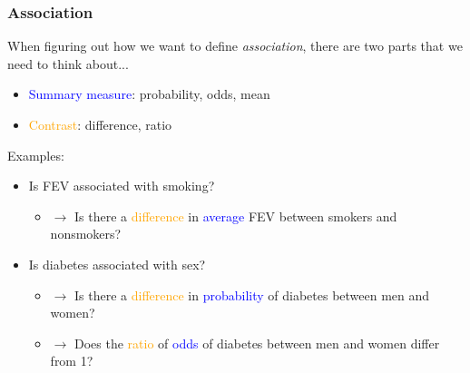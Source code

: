 \documentclass[12pt, 
hyperref={colorlinks=true, linkcolor=blue, urlcolor=cyan}]{beamer}
\begin{document}
\begin{frame}
\frametitle{Association}
When figuring out how we want to define \textit{association}, there are two parts that we need to think about...  \vspace{-0.3cm} \pause

\begin{itemize}
\item \textcolor{blue}{Summary measure}: probability, odds, mean
\item \textcolor{orange}{Contrast}: difference, ratio
\end{itemize} \pause

Examples: \vspace{-0.3cm}
\begin{itemize}
\item Is FEV associated with smoking? \pause
	\begin{itemize}
	\item[] $\rightarrow$ Is there a \textcolor{orange}{difference} in \textcolor{blue}{average} FEV between smokers and nonsmokers? \pause
	\end{itemize}
\item Is diabetes associated with sex? \pause
	\begin{itemize}
	\item[] $\rightarrow$ Is there a \textcolor{orange}{difference} in \textcolor{blue}{probability} of diabetes between men and women? \pause
	\item[] $\rightarrow$ Does the \textcolor{orange}{ratio} of \textcolor{blue}{odds} of diabetes between men and women differ from 1? %
	\end{itemize}
\end{itemize}
\end{frame}
\end{document}
